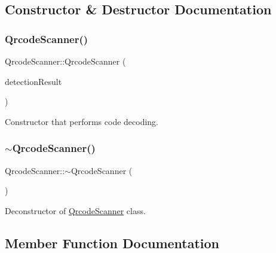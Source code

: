 \subsection{Constructor \& Destructor Documentation}
\mbox{\label{class_qrcode_scanner_a92f9835aab64e4129ae9efcd72bc7518}} 
\subsubsection{\texorpdfstring{Qrcode\+Scanner()}{QrcodeScanner()}}
{\footnotesize\ttfamily Qrcode\+Scanner\+::\+Qrcode\+Scanner (\begin{DoxyParamCaption}\item[{\hyperlink{struct_chessboard_detector_result}{Chessboard\+Detector\+Result}}]{detection\+Result }\end{DoxyParamCaption})}



Constructor that performs code decoding. 

\mbox{\label{class_qrcode_scanner_ad8670545dad4e8918b94f870f184ce80}} 
\subsubsection{\texorpdfstring{$\sim$\+Qrcode\+Scanner()}{~QrcodeScanner()}}
{\footnotesize\ttfamily Qrcode\+Scanner\+::$\sim$\+Qrcode\+Scanner (\begin{DoxyParamCaption}{ }\end{DoxyParamCaption})\hspace{0.3cm}{\ttfamily [inline]}}



Deconstructor of \hyperlink{class_qrcode_scanner}{Qrcode\+Scanner} class. 



\subsection{Member Function Documentation}
\mbox{\label{class_qrcode_scanner_ae2f75fcf7fbe48678a57c2e0eb3ca163}} 
